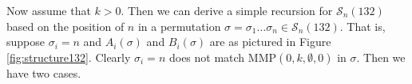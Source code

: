 \documentclass[
final,nomarks
]{dmtcs-episciences}
\newcommand{\fref}[1]{Figure \ref{fig:#1}}
\newcommand{\Sn}[1]{\mathcal{S}_{#1}}
\newcommand{\MMP}{\mathrm{MMP}}
\begin{document}
Now assume that \begin{math}k>0\end{math}. Then we can derive a simple recursion for \begin{math}\Sn{n}(132)\end{math}
based on the position of \begin{math}n\end{math} in a permutation \begin{math}\sigma = \sigma_1 \ldots \sigma_n \in \Sn{n}(132)\end{math}. 
That is, suppose \begin{math}\sigma_i =n\end{math} and \begin{math}A_i(\sigma)\end{math} and \begin{math}B_i(\sigma)\end{math} are as pictured in  
\fref{structure132}. Clearly \begin{math}\sigma_i =n\end{math} does not match  \begin{math}\MMP(0,k,\emptyset,0)\end{math} in \begin{math}\sigma\end{math}. 
Then we have two cases.
\end{document}
